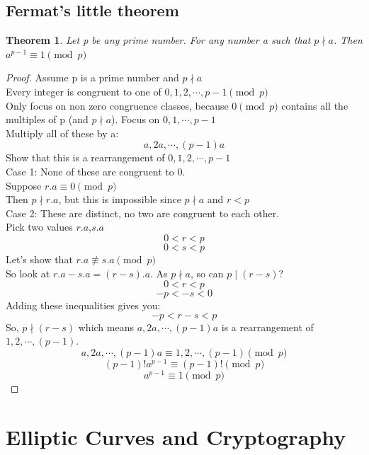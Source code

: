 \documentclass[a4paper,12pt]{report}
\newtheorem{theorem}{Theorem}
\begin{document}
\section{Fermat’s little theorem}
\begin{theorem}
	Let p be any prime number. For any number a such that $p\nmid a$. Then
	$a^{p-1}\equiv 1\pmod p$\\
\end{theorem}
\begin{proof}
Assume p is a prime number and $p \nmid a$ \\
Every integer is congruent to one of $0,1,2,\cdots,p-1\pmod p$\\
Only focus on non zero congruence classes, because $0 \pmod p$ contains all the multiples of p (and $p \nmid a$).
Focus on $0,1,\cdots,p-1$\\
Multiply all of these by a:
$$a,2a,\cdots,(p-1)a$$
Show that this is a rearrangement of $0,1,2,\cdots,p-1$\\
Case 1: None of these are congruent to 0.\\
Suppose $r.a\equiv 0 \pmod p$\\
Then $p\nmid r.a$, but this is impossible since $p\nmid a$ and $r<p$\\
Case 2: These are distinct, no two are congruent to each other.\\
Pick two values $r.a$,$s.a$\\
$$0<r<p$$
$$0<s<p$$
Let's show that $r.a \not\equiv s.a \pmod p$\\
So look at $r.a-s.a=(r-s).a$. As $p\nmid a$, so can $p \mid (r-s)?$\\
$$0<r<p$$
$$-p<-s<0$$
Adding these inequalities gives you:
$$-p<r-s<p$$
So, $p\nmid(r-s)$ which means $a,2a,\cdots,(p-1)a$ is a rearrangement of\\ $1,2,\cdots,(p-1).$
$$a,2a,\cdots,(p-1)a\equiv 1,2,\cdots,(p-1) \pmod p$$
$$(p-1)!a^{p-1}\equiv (p-1)! \pmod p$$
$$a^{p-1}\equiv 1 \pmod p$$
\end{proof} 


\cleardoublepage

\chapter{Elliptic Curves and Cryptography}
\end{document}
